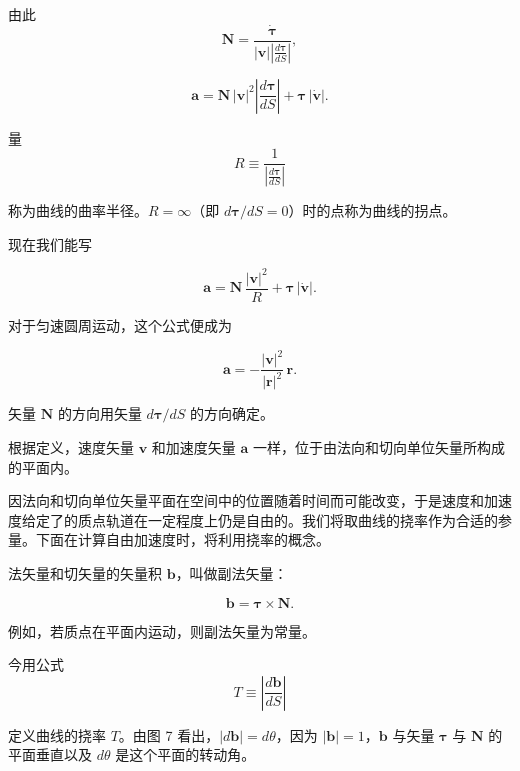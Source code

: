 \documentclass[11pt,a4paper,oneside]{ctexbook}
\newcommand{\ve}[1]{\bm{#1}}
\begin{document}
由此
\begin{equation*}
\ve{N} = \frac{\dot{\ve{\tau}}}{|\ve{v}|\left|\frac{d\ve{\tau}}{dS}\right|},
\end{equation*}

\begin{equation*}
\ve{a} = \ve{N}\,|\ve{v}|^{2}\left|\frac{d\ve{\tau}}{dS}\right| + \ve{\tau}\,|\dot{\ve{v}}|.
\end{equation*}

量
\begin{equation*}
R \equiv \frac{1}{\left|\frac{d\ve{\tau}}{dS}\right|}
\end{equation*}

称为曲线的曲率半径。$R = \infty$（即 $d\ve{\tau}/dS = 0$）时的点称为曲线的拐点。

现在我们能写

\begin{equation*}
\ve{a} = \ve{N}\,\frac{|\ve{v}|^{2}}{R} + \ve{\tau}\,|\dot{\ve{v}}|.
\end{equation*}

对于匀速圆周运动，这个公式便成为

\begin{equation*}
\ve{a} = -\frac{|\ve{v}|^{2}}{|\ve{r}|^{2}}\,\ve{r}.
\end{equation*}

矢量 $\ve{N}$ 的方向用矢量 $d\ve{\tau}/dS$ 的方向确定。

根据定义，速度矢量 $\ve{v}$ 和加速度矢量 $\ve{a}$ 一样，位于由法向和切向单位矢量所构成的平面内。

因法向和切向单位矢量平面在空间中的位置随着时间而可能改变，于是速度和加速度给定了的质点轨道在一定程度上仍是自由的。我们将取曲线的挠率作为合适的参量。下面在计算自由加速度时，将利用挠率的概念。

法矢量和切矢量的矢量积 $\ve{b}$，叫做副法矢量：

\begin{equation}
\ve{b} = \ve{\tau} \times \ve{N}.
\tag{1.16}
\end{equation}

例如，若质点在平面内运动，则副法矢量为常量。

今用公式
\begin{equation*}
T \equiv \left|\frac{d\ve{b}}{dS}\right|
\end{equation*}

定义曲线的挠率 $T$。由图 7 看出，$|d\ve{b}| = d\theta$，因为 $|\ve{b}| = 1$，$\ve{b}$ 与矢量 $\ve{\tau}$ 与 $\ve{N}$ 的平面垂直以及 $d\theta$ 是这个平面的转动角。
\end{document}
